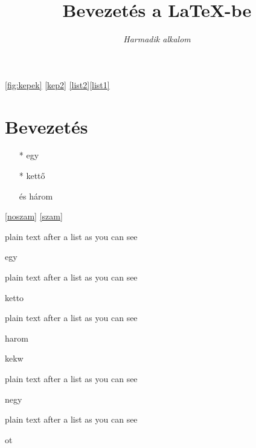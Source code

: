 \documentclass{article}
\begin{document}
	\begin{titlepage}
		\title{\Huge{Bevezetés a \LaTeX-be}}
		\author{\textit{Harmadik alkalom}}
		\date{}
		\maketitle
	\end{titlepage}
	\ref{fig:kepek} \ref{kep2}  \ref{list2}\ref{list1}
	\section{Bevezetés}
	\begin{itemize}
		\item[*] egy
		\item[*] kettő
		\item[és] három
	\end{itemize}
	\ref{noszam} \ref{szam}
	\begin{enuma}
		\item  plain text after a list as you can see
		\item egy
		\begin{enuma}
			\item  plain text after a list as you can see
			\item[] \label{noszam} ketto
			\begin{enuma}
				\item  plain text after a list as you can see
				\item harom
				\begin{enuma}
					\item kekw
				\end{enuma}
				\begin{enuma}
					\item  plain text after a list as you can see
					\item \label{szam} negy
					\begin{enuma}
						\item  plain text after a list as you can see
						\item ot
					\end{enuma}
				\end{enuma}
			\end{enuma}
		\end{enuma}
	\end{enuma}
\end{document}
